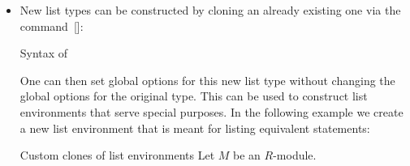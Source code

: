 \begin{itemize}
\begin{showlatex}{Global settings depending on level}
\begin{enumerate}
\begin{enumerate}
        Second entry, second subentry.
    \end{enumerate}
\end{enumerate}
    \end{showlatex}
    The counter of the first depth and second depth can be accessed via the counters~[\inlinecode] and [\inlinecode]: 
    \begin{showlatex}{Accessing level counters in settings for list environments}
\begin{enumerate}
  \item
    An entry.
    \begin{enumerate}
      \item
        Again an entry.
      \item
        Again an entry.
    \end{enumerate}
  \item
    Another entry.
    \begin{enumerate}
      \item
        Yet another entry.
      \item
        Yet another entry.
    \end{enumerate}
\end{enumerate}
    \end{showlatex}
  \item
    New list types can be constructed by cloning an already existing one via the command~[\comname]:
        \begin{showcode}{Syntax of }
    \end{showcode}
    One can then set global options for this new list type without changing the global options for the original type.
    This can be used to construct list environments that serve special purposes.
    In the following example we create a new list environment that is meant for listing equivalent statements:
    \begin{showlatex}{Custom clones of list environments}
Let $M$ be an $R$-module.

\end{showlatex}
\end{itemize}
